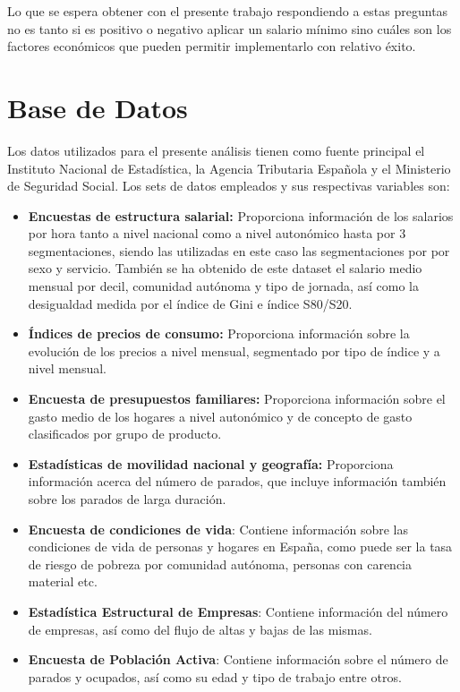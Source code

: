 \documentclass[11pt]{article}
\begin{document}
Lo que se espera obtener con el presente trabajo respondiendo a estas
preguntas no es tanto si es positivo o negativo aplicar un salario
mínimo sino cuáles son los factores económicos que pueden permitir
implementarlo con relativo éxito.

    \section{Base de Datos}

    Los datos utilizados para el presente análisis tienen como fuente
principal el Instituto Nacional de Estadística, la Agencia Tributaria
Española y el Ministerio de Seguridad Social. Los sets de datos
empleados y sus respectivas variables son:

\begin{itemize}
\item
  \textbf{Encuestas de estructura salarial:} Proporciona información de
  los salarios por hora tanto a nivel nacional como a nivel autonómico
  hasta por 3 segmentaciones, siendo las utilizadas en este caso las
  segmentaciones por por sexo y servicio. También se ha obtenido de este
  dataset el salario medio mensual por decil, comunidad autónoma y tipo
  de jornada, así como la desigualdad medida por el índice de Gini e
  índice S80/S20.
\item
  \textbf{Índices de precios de consumo:} Proporciona información sobre
  la evolución de los precios a nivel mensual, segmentado por tipo de
  índice y a nivel mensual.
\item
  \textbf{Encuesta de presupuestos familiares:} Proporciona información
  sobre el gasto medio de los hogares a nivel autonómico y de concepto
  de gasto clasificados por grupo de producto.
\item
  \textbf{Estadísticas de movilidad nacional y geografía:} Proporciona
  información acerca del número de parados, que incluye información
  también sobre los parados de larga duración.
\item
  \textbf{Encuesta de condiciones de vida}: Contiene información sobre
  las condiciones de vida de personas y hogares en España, como puede
  ser la tasa de riesgo de pobreza por comunidad autónoma, personas con
  carencia material etc.
\item
  \textbf{Estadística Estructural de Empresas}: Contiene información del
  número de empresas, así como del flujo de altas y bajas de las mismas.
\item
  \textbf{Encuesta de Población Activa}: Contiene información sobre el
  número de parados y ocupados, así como su edad y tipo de trabajo entre
  otros.
\end{itemize}
\end{document}
